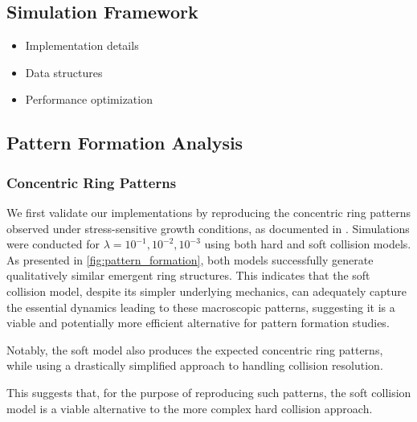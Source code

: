 \documentclass[conference]{IEEEtran}
\begin{document}
\subsection{Simulation Framework}
\begin{itemize}
    \item Implementation details
    \item Data structures
    \item Performance optimization
\end{itemize}

\newpage

\subsection{Pattern Formation Analysis}

\subsubsection{Concentric Ring Patterns}

We first validate our implementations by reproducing the concentric ring patterns observed under stress-sensitive growth conditions, as documented in \cite{Weady2024}. Simulations were conducted for $\lambda = 10^{-1}, 10^{-2}, 10^{-3}$ using both hard and soft collision models. As presented in \autoref{fig:pattern_formation}, both models successfully generate qualitatively similar emergent ring structures. This indicates that the soft collision model, despite its simpler underlying mechanics, can adequately capture the essential dynamics leading to these macroscopic patterns, suggesting it is a viable and potentially more efficient alternative for pattern formation studies.


Notably, the soft model also produces the expected concentric ring patterns, while using a drastically simplified approach to handling collision resolution.

This suggests that, for the purpose of reproducing such patterns, the soft collision model is a viable alternative to the more complex hard collision approach.
\end{document}
